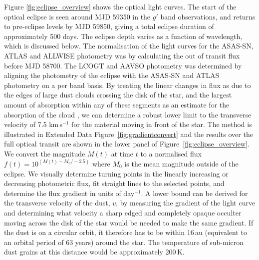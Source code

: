 \documentclass[sn-nature]{sn-jnl}%
\begin{document}
Figure \ref{fig:eclipse_overview} shows the optical light curves. The start of the optical eclipse is seen around MJD 59350 in the $g'$ band observations, and returns to pre-eclipse levels by MJD 59850, giving a total eclipse duration of approximately 500 days. The eclipse depth varies as a function of wavelength, which is discussed below.
%
The normalisation of the light curves for the ASAS-SN, ATLAS and ALLWISE photometry was by calculating the out of transit flux before MJD 58700.
%
The LCOGT and AAVSO photometry was determined by aligning the photometry of the eclipse with the ASAS-SN and ATLAS photometry on a per band basis.
%
By treating the linear changes in flux as due to the edges of large dust clouds crossing the disk of the star, and the largest amount of absorption within any of these segments as an estimate for the absorption of the cloud \citep[see equations 4.2 and 4.3 in ][]{Kennedy17}, we can determine a robust lower limit to the transverse velocity of 7.5 km\,s$^{-1}$ for the material moving in front of the star. The method is illustrated in Extended Data Figure~\ref{fig:gradientconvert} and the results over the full optical transit are shown in the lower panel of Figure~\ref{fig:eclipse_overview}.
%
%
We convert the magnitude $M(t)$ at time $t$ to a normalised flux $f(t)=10^{(M(t)-M_0/-2.5)}$ where $M_0$ is the mean magnitude outside of the eclipse.
%
We visually determine turning points in the linearly increasing or decreasing photometric flux, fit straight lines to the selected points, and determine the flux gradient in units of day$^{-1}$.
%
%
A lower bound can be derived for the transverse velocity of the dust, $v$, by measuring the gradient of the light curve and determining what velocity a sharp edged and completely opaque occulter moving across the disk of the star would be needed to make the same gradient.
%
%
%
If the dust is on a circular orbit, it therefore has to be within 16\,au (equivalent to an orbital period of 63 years) around the star. The temperature of sub-micron dust grains at this distance would be approximately 200\,K.
\end{document}
